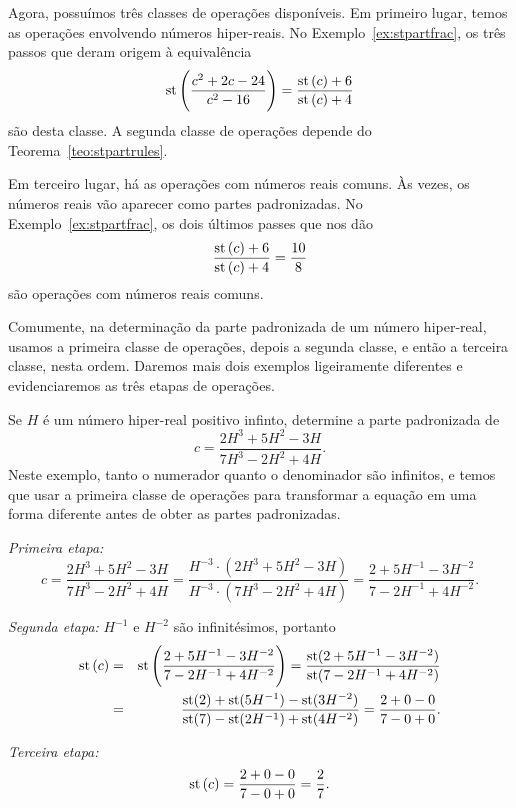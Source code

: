 \newlength\minipageindent
\setlength{\minipageindent}{\parindent}

\begin{absolutelynopagebreak}
Agora, possuímos três classes de operações disponíveis.
Em primeiro lugar, temos as operações envolvendo números hiper-reais.
No Exemplo~\ref{ex:stpartfrac},
os três passos que deram origem à equivalência
$$
  \operatorname{st}\left(\frac{c^2 + 2c - 24}{c^2 - 16}\right) = \frac{\operatorname{st}\left(c\right)+6}{\operatorname{st}\left(c\right)+4}
$$
são desta classe. A segunda classe de operações depende do
Teorema~\ref{teo:stpartrules}.
\end{absolutelynopagebreak}

Em terceiro lugar, há as operações com números reais comuns. Às vezes, os
números reais vão aparecer como partes padronizadas. No
Exemplo~\ref{ex:stpartfrac}, os dois últimos passes que nos dão
$$
  \frac{\operatorname{st}\left(c\right) + 6}{\operatorname{st}\left(c\right)+4} = \frac{10}{8}
$$
são operações com números reais comuns.

Comumente, na determinação da parte padronizada de um número hiper-real,
usamos a primeira classe de operações, depois a segunda classe, e então
a terceira classe, nesta ordem. Daremos mais dois exemplos ligeiramente
diferentes e evidenciaremos as três etapas de operações.

\begin{example}
Se $H$ é um número hiper-real positivo infinto, determine a parte padronizada 
de
$$
  c = \frac{2H^3+5H^2-3H}{7H^3-2H^2+4H}.
$$
Neste exemplo, tanto o numerador quanto o denominador são infinitos, e
temos que usar a primeira classe de operações para transformar a equação
em uma forma diferente antes de obter as partes padronizadas.

\emph{Primeira etapa:}
$$
 c = \frac{2H^3+5H^2-3H}{7H^3-2H^2+4H} = \frac{H^{-3}\cdot(2H^3+5H^2-3H)}{H^{-3}\cdot(7H^3-2H^2+4H)} = \frac{2+5H^{-1}-3H^{-2}}{7-2H^{-1}+4H^{-2}}.
$$

\emph{Segunda etapa:} $H^{-1}$ e $H^{-2}$ são infinitésimos, portanto
\begin{eqnarray*}
  \operatorname{st}\left(c\right) & = & \operatorname{st}\left(\frac{2+5H^{-1}-3H^{-2}}{7-2H^{-1}+4H^{-2}}\right) =
               \frac{\operatorname{st}(2+5H^{-1}-3H^{-2})}{\operatorname{st}(7-2H^{-1}+4H^{-2})} \\
  & = & \frac{\operatorname{st}(2)+\operatorname{st}(5H^{-1})-\operatorname{st}(3H^{-2})}{\operatorname{st}(7)-\operatorname{st}(2H^{-1})+\operatorname{st}(4H^{-2})}
        = \frac{2+0-0}{7-0+0}.
\end{eqnarray*}

\emph{Terceira etapa:}
$$
  \operatorname{st}\left(c\right) = \frac{2+0-0}{7-0+0} = \frac{2}{7}.
$$
\end{example}

